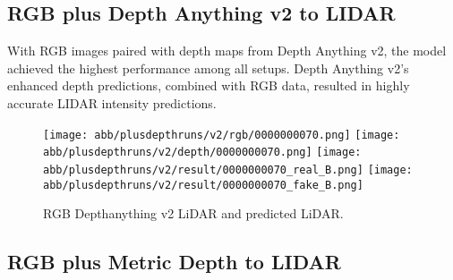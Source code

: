 \subsection{RGB plus Depth Anything v2 to LIDAR}

With RGB images paired with depth maps from Depth Anything v2, the model achieved the highest performance among all setups. Depth Anything v2’s enhanced depth predictions, combined with RGB data, resulted in highly accurate LIDAR intensity predictions.
\begin{figure}[!ht]
	\centering
	\texttt{[image: abb/plusdepthruns/v2/rgb/0000000070.png]}
	\texttt{[image: abb/plusdepthruns/v2/depth/0000000070.png]}
	\texttt{[image: abb/plusdepthruns/v2/result/0000000070\_real\_B.png]}
	\texttt{[image: abb/plusdepthruns/v2/result/0000000070\_fake\_B.png]}
	\caption{RGB Depthanything v2 LiDAR and predicted LiDAR.}
	\label{bpplusv2}
\end{figure}
\subsection{RGB plus Metric Depth to LIDAR}

